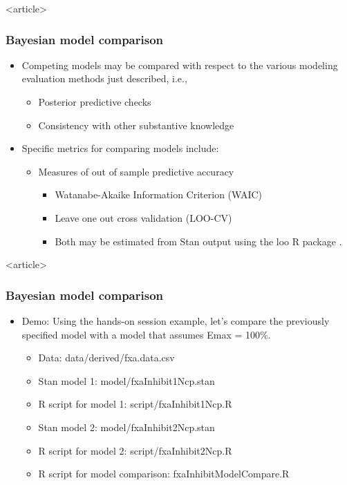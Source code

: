 \documentclass{beamer}
\begin{document}
\begin{frame}<article>
  \frametitle{Bayesian model comparison}
  
  \begin{itemize}
  \item Competing models may be compared with respect to the various
    modeling evaluation methods just described, i.e.,
    \begin{itemize}
    \item Posterior predictive checks
    \item Consistency with other substantive knowledge
    \end{itemize}
  \item Specific metrics for comparing models include:
    \begin{itemize}
    \item Measures of out of sample predictive accuracy \cite[Chapter 7]{gelman2014}
      \begin{itemize}
      \item Watanabe-Akaike Information Criterion (WAIC)
\item Leave one out cross validation (LOO-CV)
\item Both may be estimated from Stan output using the loo R package
  \cite{vehtari2015}.
      \end{itemize}
    \end{itemize}
  \end{itemize}

\end{frame}

\begin{frame}<article>
  \frametitle{Bayesian model comparison}
  
  \begin{itemize}
 \item Demo: Using the hands-on session example, let's compare the
  previously specified model with a model that assumes Emax = 100\%.
  \begin{itemize}
    \item Data: data/derived/fxa.data.csv
  \item Stan model 1: model/fxaInhibit1Ncp.stan
  \item R script for model 1: script/fxaInhibit1Ncp.R
  \item Stan model 2: model/fxaInhibit2Ncp.stan
  \item R script for model 2: script/fxaInhibit2Ncp.R
\item R script for model comparison: fxaInhibitModelCompare.R
  \end{itemize}
  \end{itemize}

\end{frame}
\end{document}
